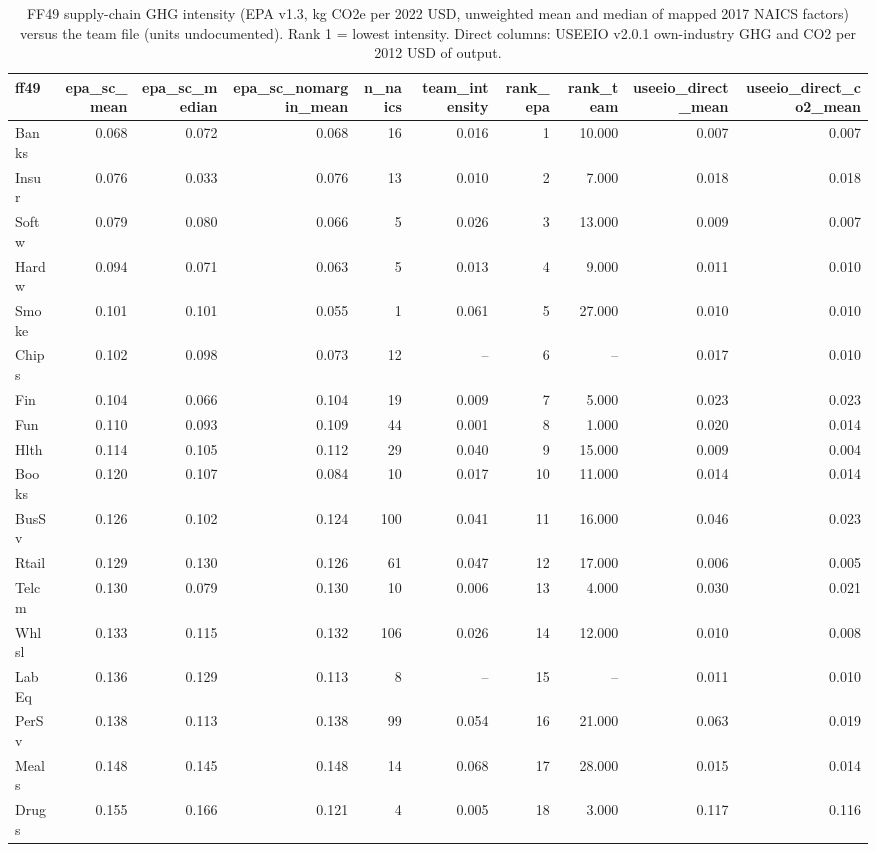 \begin{table}
\caption{FF49 supply-chain GHG intensity (EPA v1.3, kg CO2e per 2022 USD, unweighted mean and median of mapped 2017 NAICS factors) versus the team file (units undocumented). Rank 1 = lowest intensity. Direct columns: USEEIO v2.0.1 own-industry GHG and CO2 per 2012 USD of output.}
\label{tab:m4_intensity}
\begin{tabular}{lrrrrrrrrr}
\toprule
ff49 & epa\_sc\_mean & epa\_sc\_median & epa\_sc\_nomargin\_mean & n\_naics & team\_intensity & rank\_epa & rank\_team & useeio\_direct\_mean & useeio\_direct\_co2\_mean \\
\midrule
Banks & 0.068 & 0.072 & 0.068 & 16 & 0.016 & 1 & 10.000 & 0.007 & 0.007 \\
Insur & 0.076 & 0.033 & 0.076 & 13 & 0.010 & 2 & 7.000 & 0.018 & 0.018 \\
Softw & 0.079 & 0.080 & 0.066 & 5 & 0.026 & 3 & 13.000 & 0.009 & 0.007 \\
Hardw & 0.094 & 0.071 & 0.063 & 5 & 0.013 & 4 & 9.000 & 0.011 & 0.010 \\
Smoke & 0.101 & 0.101 & 0.055 & 1 & 0.061 & 5 & 27.000 & 0.010 & 0.010 \\
Chips & 0.102 & 0.098 & 0.073 & 12 & -- & 6 & -- & 0.017 & 0.010 \\
Fin & 0.104 & 0.066 & 0.104 & 19 & 0.009 & 7 & 5.000 & 0.023 & 0.023 \\
Fun & 0.110 & 0.093 & 0.109 & 44 & 0.001 & 8 & 1.000 & 0.020 & 0.014 \\
Hlth & 0.114 & 0.105 & 0.112 & 29 & 0.040 & 9 & 15.000 & 0.009 & 0.004 \\
Books & 0.120 & 0.107 & 0.084 & 10 & 0.017 & 10 & 11.000 & 0.014 & 0.014 \\
BusSv & 0.126 & 0.102 & 0.124 & 100 & 0.041 & 11 & 16.000 & 0.046 & 0.023 \\
Rtail & 0.129 & 0.130 & 0.126 & 61 & 0.047 & 12 & 17.000 & 0.006 & 0.005 \\
Telcm & 0.130 & 0.079 & 0.130 & 10 & 0.006 & 13 & 4.000 & 0.030 & 0.021 \\
Whlsl & 0.133 & 0.115 & 0.132 & 106 & 0.026 & 14 & 12.000 & 0.010 & 0.008 \\
LabEq & 0.136 & 0.129 & 0.113 & 8 & -- & 15 & -- & 0.011 & 0.010 \\
PerSv & 0.138 & 0.113 & 0.138 & 99 & 0.054 & 16 & 21.000 & 0.063 & 0.019 \\
Meals & 0.148 & 0.145 & 0.148 & 14 & 0.068 & 17 & 28.000 & 0.015 & 0.014 \\
Drugs & 0.155 & 0.166 & 0.121 & 4 & 0.005 & 18 & 3.000 & 0.117 & 0.116 \\

\end{tabular}
\end{table}

